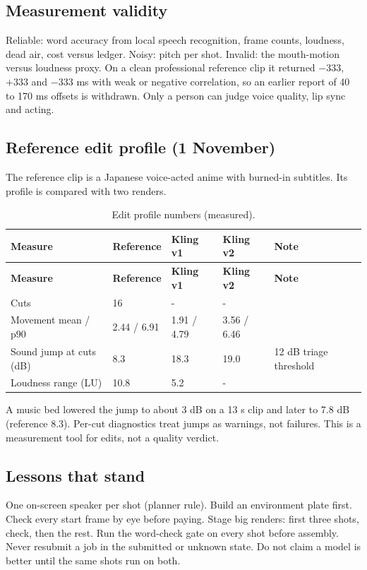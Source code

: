 \documentclass[11pt,a4paper]{article}
\begin{document}
\subsection{Measurement validity}
Reliable: word accuracy from local speech recognition, frame counts, loudness, dead air, cost versus ledger. Noisy: pitch per shot. Invalid: the mouth-motion versus loudness proxy. On a clean professional reference clip it returned $-333$, $+333$ and $-333$ ms with weak or negative correlation, so an earlier report of 40 to 170 ms offsets is withdrawn. Only a person can judge voice quality, lip sync and acting.

\subsection{Reference edit profile (1 November)}
The reference clip is a Japanese voice-acted anime with burned-in subtitles. Its profile is compared with two renders.
\begin{longtable}{@{}P{4.8cm}P{2.5cm}P{2.5cm}P{2.5cm}P{3.2cm}@{}}
\caption{Edit profile numbers (measured).}\\
\toprule \textbf{Measure} & \textbf{Reference} & \textbf{Kling v1} & \textbf{Kling v2} & \textbf{Note}\\ \midrule\endfirsthead
\toprule \textbf{Measure} & \textbf{Reference} & \textbf{Kling v1} & \textbf{Kling v2} & \textbf{Note}\\ \midrule\endhead
Cuts & 16 & - & - & \\
Movement mean / p90 & 2.44 / 6.91 & 1.91 / 4.79 & 3.56 / 6.46 & \\
Sound jump at cuts (dB) & 8.3 & 18.3 & 19.0 & 12 dB triage threshold\\
Loudness range (LU) & 10.8 & 5.2 & - & \\
\bottomrule
\end{longtable}
A music bed lowered the jump to about 3 dB on a 13 s clip and later to 7.8 dB (reference 8.3). Per-cut diagnostics treat jumps as warnings, not failures. This is a measurement tool for edits, not a quality verdict.

\subsection{Lessons that stand}
One on-screen speaker per shot (planner rule). Build an environment plate first. Check every start frame by eye before paying. Stage big renders: first three shots, check, then the rest. Run the word-check gate on every shot before assembly. Never resubmit a job in the submitted or unknown state. Do not claim a model is better until the same shots run on both.
\end{document}
